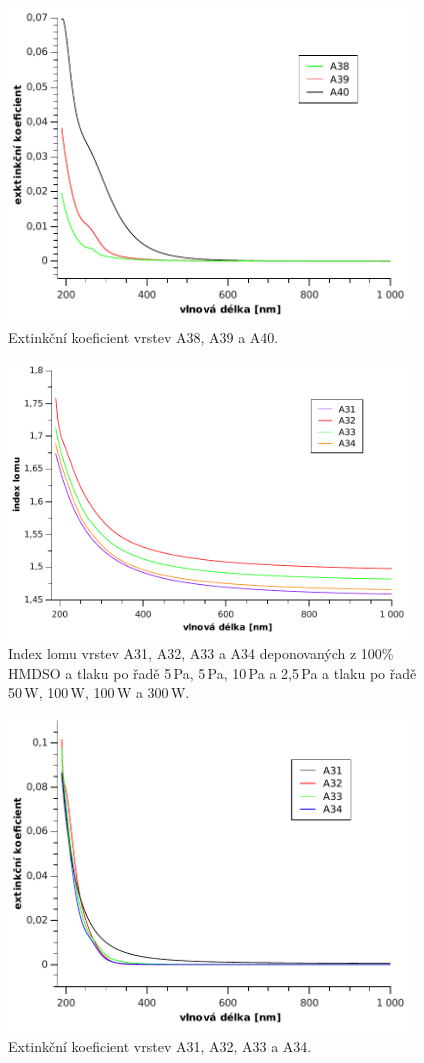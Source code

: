 \documentclass[12pt,oneside,final]{fithesis2}
\begin{document}
\begin{figure}[p]
  \centering
  \includegraphics[width=400px]{img/A38kA40k.pdf}
  \caption{Extinkční koeficient vrstev A38, A39 a A40.}
  \label{fig:A38kA40k}
\end{figure}

\begin{figure}[p]
  \centering
  \includegraphics[width=400px]{img/A31nA34n.pdf}
  \caption{Index lomu vrstev A31, A32, A33 a A34 deponovaných z 100\% HMDSO a tlaku po řadě 5\,Pa, 5\,Pa, 10\,Pa a 2,5\,Pa a tlaku po řadě 50\,W, 100\,W, 100\,W a 300\,W.}
  \label{fig:A31nA34n}
\end{figure}

\begin{figure}[p]
  \centering
  \includegraphics[width=400px]{img/A31kA34k.pdf}
  \caption{Extinkční koeficient vrstev A31, A32, A33 a A34.}
  \label{fig:A31kA34k}
\end{figure}
\end{document}
